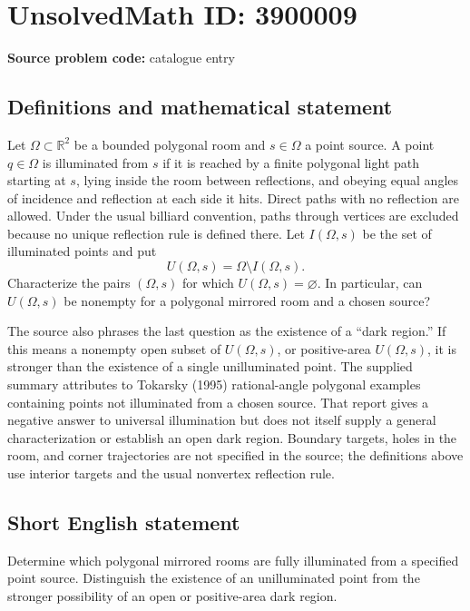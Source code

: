 \documentclass[11pt]{article}
\begin{document}
\section*{UnsolvedMath ID: 3900009}
\textbf{Source problem code:} catalogue entry
\subsection{Definitions and mathematical statement}
Let $\Omega\subset\mathbb R^2$ be a bounded polygonal room and $s\in\Omega$ a point source. A point $q\in\Omega$ is illuminated from $s$ if it is reached by a finite polygonal light path starting at $s$, lying inside the room between reflections, and obeying equal angles of incidence and reflection at each side it hits. Direct paths with no reflection are allowed. Under the usual billiard convention, paths through vertices are excluded because no unique reflection rule is defined there. Let $I(\Omega,s)$ be the set of illuminated points and put
\[
U(\Omega,s)=\Omega\setminus I(\Omega,s).
\]
Characterize the pairs $(\Omega,s)$ for which $U(\Omega,s)=\varnothing$. In particular, can $U(\Omega,s)$ be nonempty for a polygonal mirrored room and a chosen source?

The source also phrases the last question as the existence of a ``dark region.'' If this means a nonempty open subset of $U(\Omega,s)$, or positive-area $U(\Omega,s)$, it is stronger than the existence of a single unilluminated point. The supplied summary attributes to Tokarsky (1995) rational-angle polygonal examples containing points not illuminated from a chosen source. That report gives a negative answer to universal illumination but does not itself supply a general characterization or establish an open dark region. Boundary targets, holes in the room, and corner trajectories are not specified in the source; the definitions above use interior targets and the usual nonvertex reflection rule.
\subsection{Short English statement}
Determine which polygonal mirrored rooms are fully illuminated from a specified point source. Distinguish the existence of an unilluminated point from the stronger possibility of an open or positive-area dark region.
\end{document}
